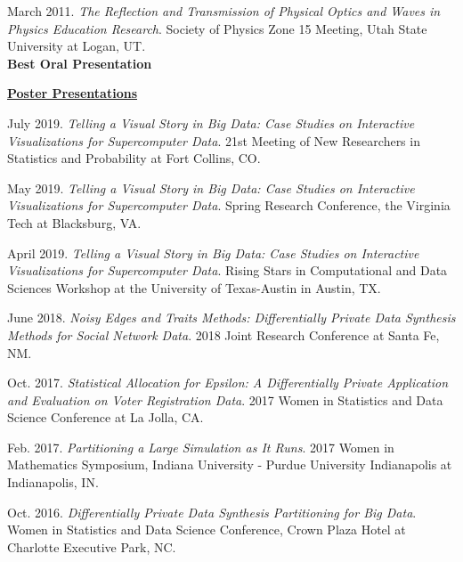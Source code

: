 \documentclass[11pt, letterpaper, roman]{moderncv} %
\begin{document}
\begin{etaremune}[topsep=0pt, itemsep=5pt, partopsep=0pt, parsep=0pt]
  \item March 2011. \textit{The Reflection and Transmission of Physical Optics and Waves in Physics Education Research}. Society of Physics Zone 15 Meeting, Utah State University at Logan, UT.\\
  \textbf{Best Oral Presentation}
  

\vspace{5pt}

\hspace{-0.30in}\underline{\textbf{\large Poster Presentations}}\normalsize
  \item July 2019. \textit{Telling a Visual Story in Big Data: Case Studies on Interactive Visualizations for Supercomputer Data}. 21st Meeting of New Researchers in Statistics and Probability at Fort Collins, CO.

  \item May 2019. \textit{Telling a Visual Story in Big Data: Case Studies on Interactive Visualizations for Supercomputer Data}. Spring Research Conference, the Virginia Tech at Blacksburg, VA.

  \item April 2019. \textit{Telling a Visual Story in Big Data: Case Studies on Interactive Visualizations for Supercomputer Data}. Rising Stars in Computational and Data Sciences Workshop at the University of Texas-Austin in Austin, TX.
  
  \item June 2018. \textit{Noisy Edges and Traits Methods: Differentially Private Data Synthesis Methods for Social Network Data}. 2018 Joint Research Conference at Santa Fe, NM.
  
  \item Oct. 2017. \textit{Statistical Allocation for Epsilon: A Differentially Private Application and Evaluation on Voter Registration Data}. 2017 Women in Statistics and Data Science Conference at La Jolla, CA.
  
  \item Feb. 2017. \textit{Partitioning a Large Simulation as It Runs}. 2017 Women in Mathematics Symposium, Indiana University - Purdue University Indianapolis at Indianapolis, IN.

  \item Oct. 2016. \textit{Differentially Private Data Synthesis Partitioning for Big Data}. Women in Statistics and Data Science Conference, Crown Plaza Hotel at Charlotte Executive Park, NC. 


\end{etaremune}
\end{document}
